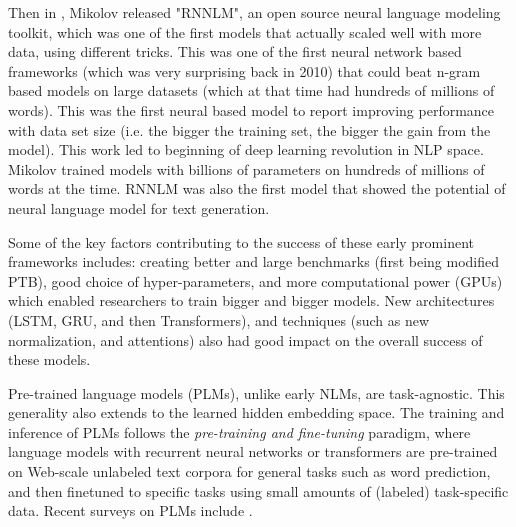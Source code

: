 Then in \cite{mikolov2011strategies, rnnlm}, Mikolov released "RNNLM", an open source neural language modeling toolkit, which was one of the first models that actually scaled well with more data, using different tricks. 
This was one of the first neural network based frameworks (which was very surprising back in 2010) that could beat n-gram based models on large datasets (which at that time had hundreds of millions of words). 
This was the first neural based model to report improving performance with data set size (i.e. the bigger the training set, the bigger the gain from the model). This work led to beginning of deep learning revolution in NLP space. Mikolov trained models with billions of parameters on hundreds of millions of words at the time.
RNNLM was also the first model that showed the potential of neural language model for text generation.
\iffalse
Fig \ref{fig:rnnlm} shows the high-level idea of this framework.
\begin{figure}[h]
\begin{center}
    \includegraphics [scale=0.6] {img/rnnlm.png}
\end{center}
  \caption{Feedforward neural network 4-gram model (on the left) and Recurrent
neural network language model (on the right), proposed by Mikolov et al. Courtesy of \cite{mikolov2011strategies}.}
\label{fig:rnnlm}
\end{figure}
\fi

Some of the key factors contributing to the success of these early prominent frameworks includes: creating better and large benchmarks (first being modified PTB), good choice of hyper-parameters, and more computational power (GPUs) which enabled researchers to train bigger and bigger models. 
New architectures (LSTM, GRU, and then Transformers), and techniques (such as new normalization, and attentions) also had good impact on the overall success of these models.


Pre-trained language models (PLMs), unlike early NLMs, are task-agnostic. This generality also extends to the learned hidden embedding space. The training and inference of PLMs follows the \emph{pre-training and fine-tuning} paradigm, where language models with recurrent neural networks \cite{peters2018deep} or transformers \cite{devlin2018bert,liu2019roberta,he2020deberta} are pre-trained on Web-scale unlabeled text corpora for general tasks such as word prediction, and then finetuned to specific tasks using small amounts of (labeled) task-specific data. Recent surveys on PLMs include \cite{zhou2023comprehensive, han2021pre,qiu2020pre}. 

